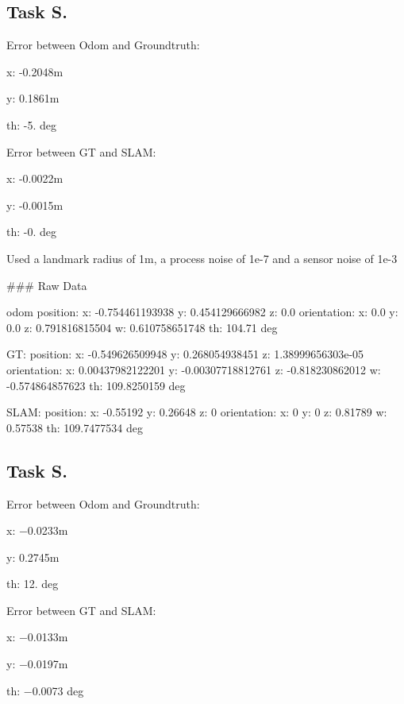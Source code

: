 \subsection*{Task S.}


\begin{DoxyItemize}
\item Error between Odom and Groundtruth\+:
\begin{DoxyItemize}
\item x\+: -\/0.\+2048m
\item y\+: 0.\+1861m
\item th\+: -\/5. deg
\end{DoxyItemize}
\item Error between GT and S\+L\+AM\+:
\begin{DoxyItemize}
\item x\+: -\/0.\+0022m
\item y\+: -\/0.\+0015m
\item th\+: -\/0. deg
\end{DoxyItemize}
\item Used a landmark radius of 1m, a process noise of 1e-\/7 and a sensor noise of 1e-\/3
\end{DoxyItemize}

 \#\#\# Raw Data 
\begin{DoxyCode}
odom
position:
  x: -0.754461193938
  y: 0.454129666982
  z: 0.0
orientation:
  x: 0.0
  y: 0.0
  z: 0.791816815504
  w: 0.610758651748
  th: 104.71 deg

GT:
position:
  x: -0.549626509948
  y: 0.268054938451
  z: 1.38999656303e-05
orientation:
  x: 0.00437982122201
  y: -0.00307718812761
  z: -0.818230862012
  w: -0.574864857623
  th: 109.8250159 deg

SLAM:
position:
x: -0.55192
y: 0.26648
z: 0
orientation:
x: 0
y: 0
z: 0.81789
w: 0.57538
th: 109.7477534 deg
\end{DoxyCode}
 \subsection*{Task S.}


\begin{DoxyItemize}
\item Error between Odom and Groundtruth\+:
\begin{DoxyItemize}
\item x\+: −0.0233m
\item y\+: 0.\+2745m
\item th\+: 12. deg
\end{DoxyItemize}
\item Error between GT and S\+L\+AM\+:
\begin{DoxyItemize}
\item x\+: −0.0133m
\item y\+: −0.0197m
\item th\+: −0.0073 deg
\end{DoxyItemize}
\end{DoxyItemize}


